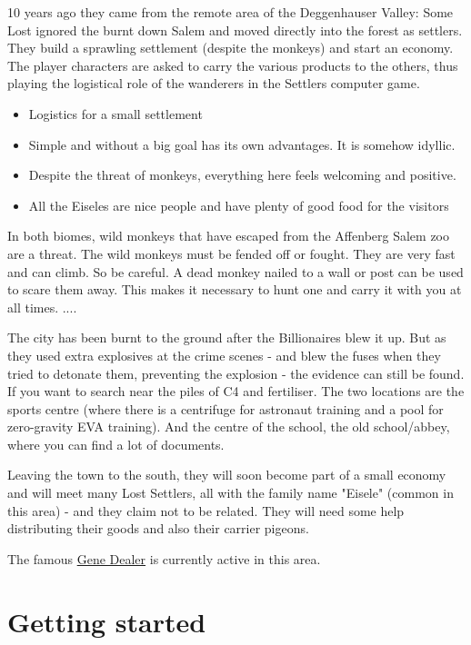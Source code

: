 10 years ago they came from the remote area of the Deggenhauser Valley: Some Lost ignored the burnt down Salem and moved directly into the forest as settlers. They build a sprawling settlement (despite the monkeys) and start an economy. The player characters are asked to carry the various products to the others, thus playing the logistical role of the wanderers in the Settlers computer game.

\begin{itemize}
    \item Logistics for a small settlement
    \item Simple and without a big goal has its own advantages. It is somehow idyllic.
    \item Despite the threat of monkeys, everything here feels welcoming and positive.
    \item All the Eiseles are nice people and have plenty of good food for the visitors
\end{itemize}

In both biomes, wild monkeys that have escaped from the Affenberg Salem zoo are a threat. The wild monkeys must be fended off or fought. They are very fast and can climb. So be careful. A dead monkey nailed to a wall or post can be used to scare them away. This makes it necessary to hunt one and carry it with you at all times. ....

The city has been burnt to the ground after the Billionaires blew it up. But as they used extra explosives at the crime scenes - and blew the fuses when they tried to detonate them, preventing the explosion - the evidence can still be found. If you want to search near the piles of C4 and fertiliser. The two locations are the sports centre (where there is a centrifuge for astronaut training and a pool for zero-gravity EVA training). And the centre of the school, the old school/abbey, where you can find a lot of documents.

Leaving the town to the south, they will soon become part of a small economy and will meet many Lost Settlers, all with the family name "Eisele" (common in this area) - and they claim not to be related.
They will need some help distributing their goods and also their carrier pigeons.

The famous \hyperref[sec:Gene Dealer]{Gene Dealer} is currently active in this area.

\section{Getting started}

